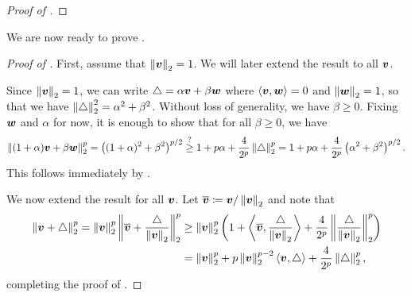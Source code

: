 \begin{proof}[Proof of ]
\end{proof}


We are now ready to prove .

\begin{proof}[Proof of ]
First, assume that $\left\lVert \bm{v} \right\rVert_2=1$. We will later extend the result to all $\bm{v}$.

Since $\left\lVert \bm{v} \right\rVert_2=1$, we can write $\triangle = \alpha\bm{v}+\beta\bm{w}$ where $\left\langle \bm{v},\bm{w} \right\rangle = 0$ and $\left\lVert \bm{w} \right\rVert_2=1$, so that we have $\left\lVert \triangle \right\rVert_2^2=\alpha^2+\beta^2$. Without loss of generality, we have $\beta \ge 0$. Fixing $\bm{w}$ and $\alpha$ for now, it is enough to show that for all $\beta \ge 0$, we have
\begin{align*}
    \left\lVert (1+\alpha)\bm{v}+\beta\bm{w} \right\rVert_2^p = \left((1+\alpha)^2+\beta^2\right)^{p/2} \overset{?}{\ge} 1+p\alpha + \frac{4}{2^p}\left\lVert \triangle \right\rVert_2^p = 1+p\alpha + \frac{4}{2^p}\left(\alpha^2+\beta^2\right)^{p/2}.
\end{align*}
This follows immediately by .

We now extend the result for all $\bm{v}$. Let $\overline{\bm{v}} \coloneqq \bm{v}/\left\lVert \bm{v} \right\rVert_2$ and note that
\begin{align*}
    \left\lVert \bm{v}+\triangle \right\rVert_2^p = \left\lVert \bm{v} \right\rVert_2^p\left\lVert \overline{\bm{v}}+\frac{\triangle}{\left\lVert \bm{v} \right\rVert_2} \right\rVert_2^p &\ge \left\lVert \bm{v} \right\rVert_2^p\left(1+\left\langle \overline{\bm{v}},\frac{\triangle}{\left\lVert \bm{v} \right\rVert_2} \right\rangle+\frac{4}{2^p}\left\lVert \frac{\triangle}{\left\lVert \bm{v} \right\rVert_2} \right\rVert_2^p\right) \\
    &= \left\lVert \bm{v} \right\rVert_2^p+p\left\lVert \bm{v} \right\rVert_2^{p-2}\left\langle \bm{v},\triangle \right\rangle+\frac{4}{2^p}\left\lVert \triangle \right\rVert_2^p,
\end{align*}
completing the proof of .
\end{proof}


